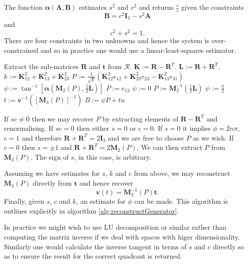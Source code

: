 \begin{definition}
The function $\mathbf{\alpha}(\mathbf{A},\mathbf{B})$ estimates $s^2$ 
and $c^2$ and returns $\frac{s}{c}$ given the constraints
\[
\mathbf{B} = c^2 \mathbf{I}_3 - s^2\mathbf{A}
\]
and
\[
c^2 + s^2 = 1.
\]
There are four constraints in two unknowns and hence the system is over-constrained and
so in practice one would use a linear-least-squares estimator.
\end{definition}

\begin{fancyalg}
\begin{algorithmic}[1]
\STATE Extract the sub-matrices $\mathbf{R}$ and $\mathbf{t}$ from $\mathcal{R}$.
\STATE $\mathbf{K} := \mathbf{R} - \mathbf{R}^T$.
\STATE $\mathbf{L} := \mathbf{R} + \mathbf{R}^T$.
\STATE $k := \mathbf{K}^2_{12} + \mathbf{K}^2_{13} + \mathbf{K}^2_{23} $
\STATE $P := \frac{1}{\sqrt{k}}\left(\mathbf{K}^2_{12}e_{12} + \mathbf{K}^2_{23}e_{23} - \mathbf{K}^2_{13}e_{31}\right)$
\STATE $\psi := \tan^{-1}\left[\mathbf{\alpha}\left(\mathbf{M}_2(P), \frac{1}{2}\mathbf{L}\right)\right]$
\ELSE
{}
\STATE $P := e_{12}$
\STATE $\psi := 0$
\ELSE
\STATE $P := \mathbf{M}^{-1}_2\left(\frac{1}{2}\mathbf{L}\right)$
\STATE $\psi := \frac{\pi}{2}$
\ENDIF
\ENDIF
\STATE $t := \mathbf{v}^{-1}\left(\left[\mathbf{M}_3(P)\right]^{-1}\right)$
\STATE $B := \psi P + tn$
\end{algorithmic}
\caption{Reconstruction of a generator from a $4\times4$ transformation matrix.%
\label{alg:reconstructGenerator}}
\end{fancyalg}

If $sc \ne 0$ then we may recover $P$ by extracting elements of 
$\mathbf{R} - \mathbf{R}^{T}$ and renormalising. If $sc = 0$ then either
$s = 0$ or $c = 0$. If $s = 0$ it implies $\phi = 2n\pi$, $c = 1$ and 
therefore
$\mathbf{R} + \mathbf{R}^{T} = 2\mathbf{I}_3$ and
we are free to choose $P$ as we wish. If $c = 0$ then $s = \pm 1$
and $\mathbf{R} + \mathbf{R}^{T} = 2 \mathbf{M}_2(P)$. We can then
extract $P$ from $\mathbf{M}_2(P)$. The sign of $s$, in this case, is arbitrary.

Assuming we have estimates for $s$, $k$ and $c$ from above, we may
reconstruct $\mathbf{M}_3(P)$ directly from $\mathbf{t}$ and hence recover
\[
\mathbf{v}(t) = \mathbf{M}^{-1}_3(P) \mathbf{t}.
\]
Finally, given $s$, $c$ and $k$, an estimate for 
$\phi$ can be made. This algorithm is outlines explicitly in algorithm 
\ref{alg:reconstructGenerator}.

In practice we might wish to use LU decomposition or similar rather
than computing the matrix inverse if we deal with spaces with higer
dimensionality. Similarly one would calculate the inverse tangent in terms
of $s$ and $c$ directly so as to ensure the result for the correct quadrant is
returned.
